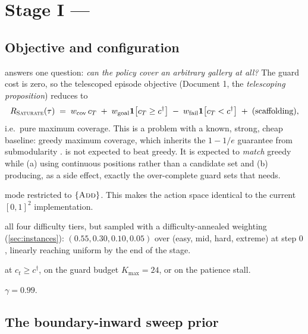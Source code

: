 \documentclass[11pt,a4paper]{article}
\begin{document}
\section{Stage I --- \stageI{}}

\subsection{Objective and configuration}

\stageI{} answers one question: \emph{can the policy cover an arbitrary gallery at all?}
The guard cost is zero, so the telescoped episode objective (Document 1,
the \emph{telescoping proposition}) reduces to
\[
  R_{\textsc{Saturate}{}}(\tau) \;=\; w_{\mathrm{cov}}\,c_T \;+\; w_{\mathrm{goal}}\mathbf{1}\!\left[c_T \ge c^{\dagger}\right]
  \;-\; w_{\mathrm{fail}}\mathbf{1}\!\left[c_T < c^{\dagger}\right]
  \;+\; \text{(scaffolding)} ,
\]
i.e.\ pure maximum coverage. This is a problem with a known, strong, cheap baseline: greedy
maximum coverage, which inherits the $1 - 1/e$ guarantee from submodularity
\cite{nemhauser1978}. \stageI{} is not expected to beat greedy. It is expected to
\emph{match} greedy while (a) using continuous positions rather than a candidate set and
(b) producing, as a side effect, exactly the over-complete guard sets that \stageII{} needs.

\begin{description}[style=nextline,leftmargin=1.2em]
\item[Action mask:] mode restricted to $\{\textsc{Add}\}$. This makes the action space identical to
  the current $[0,1]^2$ implementation.
\item[Instance distribution $\Dctx$:] all four difficulty tiers, but sampled with a
  difficulty-annealed weighting (\cref{sec:instances}): $(0.55, 0.30, 0.10, 0.05)$ over
  (easy, mid, hard, extreme) at step $0$, linearly reaching uniform by the end of the stage.
\item[Termination:] at $c_t \ge c^{\dagger}$, on the guard budget $K_{\max} = 24$, or on the
  patience stall.
\item[Discount:] $\gamma = 0.99$.
\end{description}

\subsection{The boundary-inward sweep prior}
\end{document}

